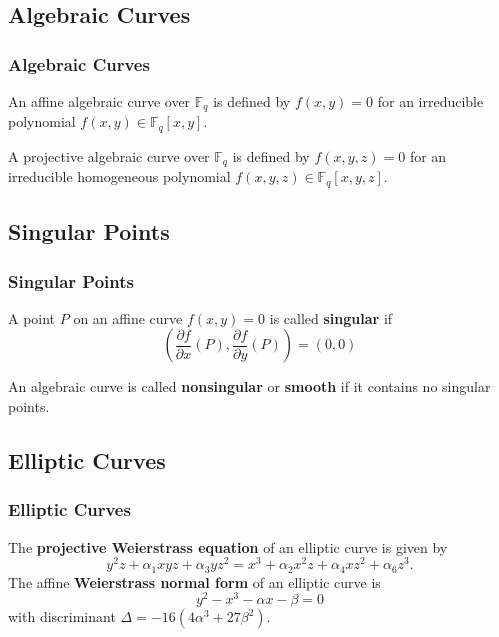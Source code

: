 \documentclass{beamer}
\begin{document}
    \subsection{Algebraic Curves}
    \begin{frame}
        \frametitle{Algebraic Curves}
        \begin{definition}
            An affine algebraic curve over \(\mathbb{F}_q\) is defined by
            \(f(x, y) = 0\) for an irreducible polynomial
            \(f(x, y) \in \mathbb{F}_q[x, y]\).
        \end{definition}
        \vfill
        \begin{definition}
            A projective algebraic curve over \(\mathbb{F}_q\) is defined by
            \(f(x, y, z) = 0\) for an irreducible homogeneous polynomial
            \(f(x, y, z) \in \mathbb{F}_q[x, y, z]\).
        \end{definition}
    \end{frame}

    \subsection{Singular Points}
    \begin{frame}
        \frametitle{Singular Points}
        \begin{definition}
            A point \(P\) on an affine curve \(f(x, y) = 0\) is called
            \textbf{singular} if
            \[\left(\frac{\partial f}{\partial x}(P),
                    \frac{\partial f}{\partial y}(P)\right) = (0, 0)\]
        \end{definition}
        \vfill
        \begin{definition}
            An algebraic curve is called \textbf{nonsingular} or
            \textbf{smooth} if it contains no singular points.
        \end{definition}
    \end{frame}

    \subsection{Elliptic Curves}
    \begin{frame}[label=forms]
        \frametitle{Elliptic Curves}
        The \textbf{projective Weierstrass equation} of an elliptic curve is
        given by
        \[y^2z + \alpha_1xyz + \alpha_3yz^2 =
          x^3 + \alpha_2x^2z + \alpha_4xz^2 + \alpha_6z^3.\]
        \vfill
        The affine \textbf{Weierstrass normal form} of an elliptic curve is
        \[y^2 - x^3 - \alpha x - \beta = 0\] with
        discriminant \(\Delta = -16(4\alpha^3 + 27\beta^2)\).

        \hyperlink{maps}{}
    \end{frame}
\end{document}
